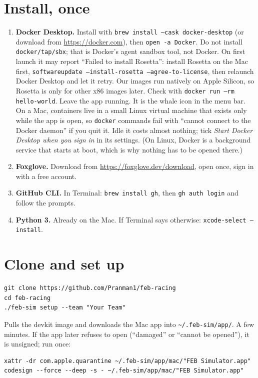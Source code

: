
\section{Install, once}

\begin{enumerate}
  \item \textbf{Docker Desktop.} Install with \texttt{brew install --cask docker-desktop} (or download
  from \url{https://docker.com}), then \texttt{open -a Docker}. Do not install \texttt{docker/tap/sbx};
  that is Docker's agent sandbox tool, not Docker. On first launch it may report ``Failed to install
  Rosetta'': install Rosetta on the Mac first, \texttt{softwareupdate --install-rosetta
  --agree-to-license}, then relaunch Docker Desktop and let it retry. Our images run natively on Apple
  Silicon, so Rosetta is only for other x86 images later. Check with \texttt{docker run --rm hello-world}.
  Leave the app running.
  It is the whale icon in the menu bar. On a Mac, containers live in a small Linux virtual machine
  that exists only while the app is open, so \texttt{docker} commands fail with ``cannot connect to
  the Docker daemon'' if you quit it. Idle it costs almost nothing; tick \emph{Start Docker Desktop
  when you sign in} in its settings. (On Linux, Docker is a background service that starts at boot,
  which is why nothing has to be opened there.)
  \item \textbf{Foxglove.} Download from \url{https://foxglove.dev/download}, open once, sign in with a free account.
  \item \textbf{GitHub CLI.} In Terminal: \texttt{brew install gh}, then \texttt{gh auth login} and follow the prompts.
  \item \textbf{Python 3.} Already on the Mac. If Terminal says otherwise: \texttt{xcode-select --install}.
\end{enumerate}

\section{Clone and set up}

\begin{lstlisting}
git clone https://github.com/Pranman1/feb-racing
cd feb-racing
./feb-sim setup --team "Your Team"
\end{lstlisting}

Pulls the devkit image and downloads the Mac app into \texttt{\textasciitilde/.feb-sim/app/}.
A few minutes. If the app later refuses to open (``damaged'' or ``cannot be opened''), it is
unsigned; run once:

\begin{lstlisting}
xattr -dr com.apple.quarantine ~/.feb-sim/app/mac/"FEB Simulator.app"
codesign --force --deep -s - ~/.feb-sim/app/mac/"FEB Simulator.app"
\end{lstlisting}


